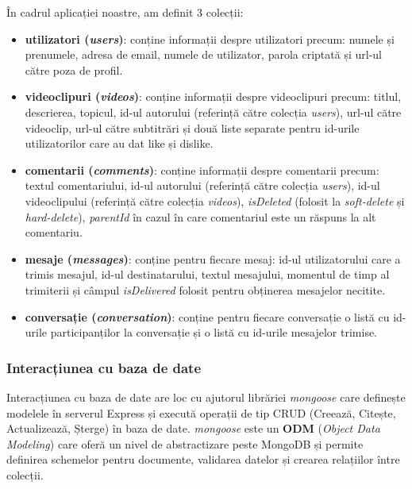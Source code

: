 \par
În cadrul aplicației noastre, am definit 3 colecții:
\begin{itemize}
    \item \textbf{utilizatori (\textit{users})}: conține informații despre utilizatori precum: numele și prenumele, adresa de
    email, numele de utilizator, parola criptată și url-ul către poza de profil.
    \item \textbf{videoclipuri (\textit{videos})}: conține informații despre videoclipuri precum: titlul, descrierea, topicul,
    id-ul autorului (referință către colecția \textit{users}), url-ul către videoclip, url-ul către
    subtitrări și două liste separate pentru id-urile utilizatorilor care au dat like și dislike.
    \item \textbf{comentarii (\textit{comments})}: conține informații despre comentarii precum: textul comentariului, 
    id-ul autorului (referință către colecția \textit{users}), id-ul videoclipului (referință către
    colecția \textit{videos}), \textit{isDeleted} (folosit la \textit{soft-delete} și \textit{hard-delete}), 
    \textit{parentId} în cazul în care comentariul este un răspuns la alt comentariu.
    \item \textbf{mesaje (\textit{messages})}: conține pentru fiecare mesaj: id-ul utilizatorului care a trimis mesajul,
    id-ul destinatarului, textul mesajului, momentul de timp al trimiterii și câmpul \textit{isDelivered} folosit pentru
    obținerea mesajelor necitite.
    \item \textbf{conversație (\textit{conversation})}: conține pentru fiecare conversație o listă cu id-urile participanților
    la conversație și o listă cu id-urile mesajelor trimise.
\end{itemize}

\subsubsection{Interacțiunea cu baza de date}

\par
Interacțiunea cu baza de date are loc cu ajutorul librăriei \textit{mongoose} care definește modelele
în serverul Express și execută operații de tip CRUD (Creează, Citește, Actualizează, Șterge) în baza de date.
\textit{mongoose} este un \textbf{ODM} (\textit{Object Data Modeling}) care oferă un nivel de abstractizare peste MongoDB
și permite definirea schemelor pentru documente, validarea datelor și crearea relațiilor între colecții.

